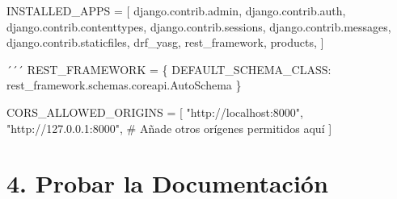 \documentclass[
  a4paper,
  DIV=11,
  numbers=noendperiod,
  onepage,
  openany]{scrreprt}
\newenvironment{Shaded}{\begin{snugshade}}{\end{snugshade}}
\newcommand{\CommentTok}[1]{\textcolor[rgb]{0.37,0.37,0.37}{#1}}
\newcommand{\NormalTok}[1]{\textcolor[rgb]{0.00,0.23,0.31}{#1}}
\newcommand{\OperatorTok}[1]{\textcolor[rgb]{0.37,0.37,0.37}{#1}}
\newcommand{\StringTok}[1]{\textcolor[rgb]{0.13,0.47,0.30}{#1}}
\begin{document}
\begin{Shaded}
\begin{Highlighting}[]
\NormalTok{INSTALLED\_APPS }\OperatorTok{=}\NormalTok{ [}
    \StringTok{\textquotesingle{}django.contrib.admin\textquotesingle{}}\NormalTok{,}
    \StringTok{\textquotesingle{}django.contrib.auth\textquotesingle{}}\NormalTok{,}
    \StringTok{\textquotesingle{}django.contrib.contenttypes\textquotesingle{}}\NormalTok{,}
    \StringTok{\textquotesingle{}django.contrib.sessions\textquotesingle{}}\NormalTok{,}
    \StringTok{\textquotesingle{}django.contrib.messages\textquotesingle{}}\NormalTok{,}
    \StringTok{\textquotesingle{}django.contrib.staticfiles\textquotesingle{}}\NormalTok{,}
    \StringTok{\textquotesingle{}drf\_yasg\textquotesingle{}}\NormalTok{,}
    \StringTok{\textquotesingle{}rest\_framework\textquotesingle{}}\NormalTok{,}
    \StringTok{\textquotesingle{}products\textquotesingle{}}\NormalTok{,}
\NormalTok{]}

\NormalTok{´´´}
\NormalTok{REST\_FRAMEWORK }\OperatorTok{=}\NormalTok{ \{}
    \StringTok{\textquotesingle{}DEFAULT\_SCHEMA\_CLASS\textquotesingle{}}\NormalTok{: }\StringTok{\textquotesingle{}rest\_framework.schemas.coreapi.AutoSchema\textquotesingle{}}
\NormalTok{\}}

\NormalTok{CORS\_ALLOWED\_ORIGINS }\OperatorTok{=}\NormalTok{ [}
    \StringTok{"http://localhost:8000"}\NormalTok{,}
    \StringTok{"http://127.0.0.1:8000"}\NormalTok{,}
    \CommentTok{\# Añade otros orígenes permitidos aquí}
\NormalTok{]}
\end{Highlighting}
\end{Shaded}

\section{4. Probar la Documentación}\label{probar-la-documentaciuxf3n}
\end{document}
